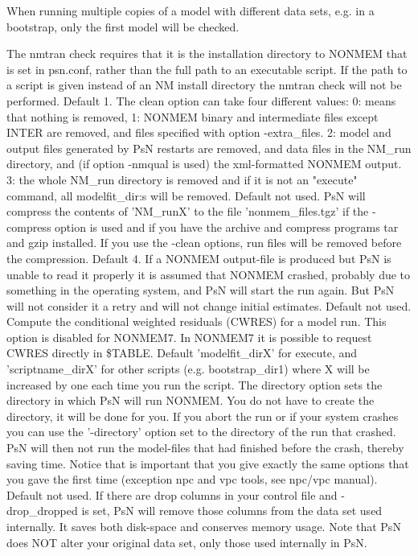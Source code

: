 \begin{optionlist}
When running multiple copies of a model with different data sets, e.g. in a bootstrap, only the first model will be checked. 

The nmtran check requires that it is the installation directory to NONMEM that is set in psn.conf, rather than the full path to an executable script. If the path to a script is given instead of an NM install directory the nmtran check will not be performed.
\nextopt
{}
Default 1. The clean option can take four different values:  0: means that nothing is removed, 1: NONMEM binary and intermediate files except INTER are removed, and files specified with option -extra\_files. 2: model and output files generated by PsN restarts are removed, and data files in the NM\_run directory, and (if option -nmqual is used) the xml-formatted NONMEM output. 3: the whole NM\_run directory is removed and if it is not an "execute" command, all modelfit\_dir:s will be removed. 
\nextopt
{}
Default not used. PsN will compress the contents of 'NM\_runX' to the file 'nonmem\_files.tgz' if the -compress option is used and if you have the archive and compress programs tar and gzip installed. If you use the -clean options, run files will be removed before the compression.  
\nextopt
{}
Default 4. If a NONMEM output-file is produced but PsN is unable to read it properly it is assumed that NONMEM crashed, probably due to something in the operating system, and PsN will start the run again. But PsN will not consider it a retry and will not change initial estimates. 
\nextopt
{}
Default not used. Compute the conditional weighted residuals (CWRES) for a model run. This option is disabled for NONMEM7. In NONMEM7 it is possible to request CWRES directly in \$TABLE. 
\nextopt
{}
Default 'modelfit\_dirX' for execute, and 'scriptname\_dirX' for other scripts (e.g. bootstrap\_dir1) where X will be increased by one each time you run the script. The directory option sets the directory in which PsN will run  NONMEM. You do not have to create the directory,  it will be done for you. If you abort the run or if your system crashes you can use the '-directory' option set to the directory of the run that crashed. PsN will then not run the model-files that had finished before the crash, thereby saving time. Notice that is important that you give exactly the same options that you gave the first time (exception npc and vpc tools, see npc/vpc manual). 
\nextopt
{}
Default not used. If there are drop columns in your control file and -drop\_dropped is set, PsN will remove those columns from the data set used internally. It saves both disk-space and conserves memory usage. Note that PsN does NOT alter your original data set, only those used internally in PsN. 

\end{optionlist}

